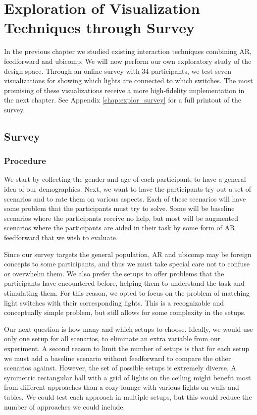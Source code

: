 \chapter{Exploration of Visualization Techniques through Survey} \label{chap:explor}
In the previous chapter we studied existing interaction techniques combining AR, feedforward and ubicomp. We will now perform our own exploratory study of the design space. Through an online survey with 34 participants, we test seven visualizations for showing which lights are connected to which switches. The most promising of these visualizations receive a more high-fidelity implementation in the next chapter. See Appendix \ref{chap:explor_survey} for a full printout of the survey.

\section{Survey} \label{sec:explor:survey}
    \subsection{Procedure} \label{subsec:explor:survey:procedure}
    We start by collecting the gender and age of each participant, to have a general idea of our demographics. Next, we want to have the participants try out a set of scenarios and to rate them on various aspects. Each of these scenarios will have some problem that the participants must try to solve. Some will be baseline scenarios where the participants receive no help, but most will be augmented scenarios where the participants are aided in their task by some form of AR feedforward that we wish to evaluate.

    Since our survey targets the general population, AR and ubicomp may be foreign concepts to some participants, and thus we must take special care not to confuse or overwhelm them. We also prefer the setups to offer problems that the participants have encountered before, helping them to understand the task and stimulating them. For this reason, we opted to focus on the problem of matching light switches with their corresponding lights. This is a recognizable and conceptually simple problem, but still allows for some complexity in the setups.
    
    Our next question is how many and which setups to choose. Ideally, we would use only one setup for all scenarios, to eliminate an extra variable from our experiment. A second reason to limit the number of setups is that for each setup we must add a baseline scenario without feedforward to compare the other scenarios against. However, the set of possible setups is extremely diverse. A symmetric rectangular hall with a grid of lights on the ceiling might benefit most from different approaches than a cozy lounge with various lights on walls and tables. We could test each approach in multiple setups, but this would reduce the number of approaches we could include.
    
